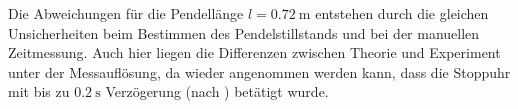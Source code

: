 Die Abweichungen für die Pendellänge $l=\SI{0.72}{\meter}$ entstehen durch die gleichen Unsicherheiten beim Bestimmen des Pendelstillstands und bei der manuellen Zeitmessung.
Auch hier liegen die Differenzen zwischen Theorie und Experiment unter der Messauflösung, da wieder angenommen werden kann, dass die Stoppuhr mit bis zu $\SI{0.2}{\second}$ Verzögerung (nach \cite{CS-Pro}) betätigt wurde.\\
